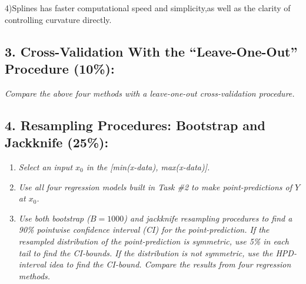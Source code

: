 \documentclass[]{article}
\providecommand{\tightlist}{%
  \setlength{\itemsep}{0pt}\setlength{\parskip}{0pt}}
\begin{document}
4)Splines has faster computational speed and simplicity,as well as the
clarity of controlling curvature directly.

\subsection{\texorpdfstring{3. Cross-Validation With the
``Leave-One-Out'' Procedure
(10\%):}{3. Cross-Validation With the Leave-One-Out Procedure (10\%):}}\label{cross-validation-with-the-leave-one-out-procedure-10}

\emph{Compare the above four methods with a leave-one-out
cross-validation procedure.}

\subsection{4. Resampling Procedures: Bootstrap and Jackknife
(25\%):}\label{resampling-procedures-bootstrap-and-jackknife-25}

\begin{enumerate}
\def\labelenumi{\arabic{enumi})}
\tightlist
\item
  \emph{Select an input \(x_0\) in the {[}min(x-data),
  max(x-data){]}.}\\
\item
  \emph{Use all four regression models built in Task \#2 to make
  point-predictions of \(Y\) at \(x_0\).}\\
\item
  \emph{Use both bootstrap (\(B = 1000\)) and jackknife resampling
  procedures to find a 90\% pointwise confidence interval (CI) for the
  point-prediction. If the resampled distribution of the
  point-prediction is symmetric, use 5\% in each tail to find the
  CI-bounds. If the distribution is not symmetric, use the HPD-interval
  idea to find the CI-bound. Compare the results from four regression
  methods.}
\end{enumerate}
\end{document}
